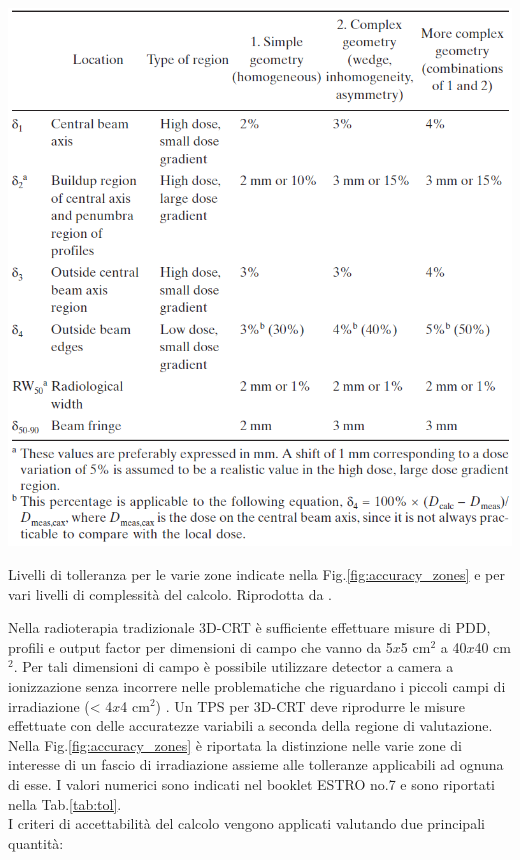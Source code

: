 \begin{table}
\centering
\includegraphics[width=\textwidth]{./cap2/accuracy_tol.png}
\caption{Livelli di tolleranza per le varie zone indicate nella Fig.\ref{fig:accuracy_zones} e per vari livelli di complessità del calcolo. Riprodotta da \cite{Mijnheer2004}.}
\label{tab:tol}
\end{table}
Nella radioterapia tradizionale 3D-CRT è sufficiente effettuare misure di PDD, profili e output factor per dimensioni di campo che vanno da 5$x$5 cm$^2$ a 40$x$40 cm$^2$. Per tali dimensioni di campo è possibile utilizzare detector a camera a ionizzazione senza incorrere nelle problematiche che riguardano i piccoli campi di irradiazione (< 4$x$4 cm$^2$) \cite{Das2008}. Un TPS per 3D-CRT deve riprodurre le misure effettuate con delle accuratezze variabili a seconda della regione di valutazione. Nella Fig.\ref{fig:accuracy_zones} è riportata la distinzione  nelle varie zone di interesse di un fascio di irradiazione assieme alle tolleranze applicabili ad ognuna di esse. I valori numerici sono indicati nel booklet ESTRO no.7 e sono riportati nella Tab.\ref{tab:tol}.\\
I criteri di accettabilità del calcolo vengono applicati valutando due principali quantità:

